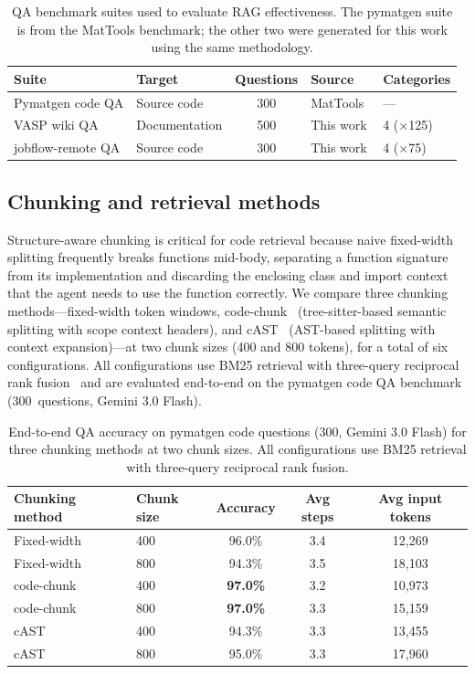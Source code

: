 \documentclass{article}
\begin{document}
\begin{table}[t]
  \caption{QA benchmark suites used to evaluate RAG effectiveness. The pymatgen suite is from the MatTools benchmark; the other two were generated for this work using the same methodology.}
  \label{tbl:benchmarks}
  \centering\small
  \begin{tabular}{llcll}
    \toprule
    Suite & Target & Questions & Source & Categories \\
    \midrule
    Pymatgen code QA & Source code & 300 & MatTools~\citep{Liu2025mattools} & --- \\
    VASP wiki QA & Documentation & 500 & This work & 4 ($\times$125) \\
    jobflow-remote QA & Source code & 300 & This work & 4 ($\times$75) \\
    \bottomrule
  \end{tabular}
\end{table}


\subsection{Chunking and retrieval methods}
\label{sec:chunking}

Structure-aware chunking is critical for code retrieval because naive fixed-width splitting frequently breaks functions mid-body, separating a function signature from its implementation and discarding the enclosing class and import context that the agent needs to use the function correctly.
We compare three chunking methods---fixed-width token windows, code-chunk~\citep{codechunk} (tree-sitter-based semantic splitting with scope context headers), and cAST~\citep{Zhang2025cast} (AST-based splitting with context expansion)---at two chunk sizes (400 and 800 tokens), for a total of six configurations.
All configurations use BM25 retrieval with three-query reciprocal rank fusion~\citep{Cormack2009} and are evaluated end-to-end on the pymatgen code QA benchmark (300~questions, Gemini 3.0 Flash).

\begin{table}[t]
  \caption{End-to-end QA accuracy on pymatgen code questions (300, Gemini 3.0 Flash) for three chunking methods at two chunk sizes. All configurations use BM25 retrieval with three-query reciprocal rank fusion.}
  \label{tbl:chunking}
  \centering\small
  \begin{tabular}{llccc}
    \toprule
    Chunking method & Chunk size & Accuracy & Avg steps & Avg input tokens \\
    \midrule
    Fixed-width & 400 & 96.0\% & 3.4 & 12{,}269 \\
    Fixed-width & 800 & 94.3\% & 3.5 & 18{,}103 \\
    code-chunk & 400 & \textbf{97.0\%} & 3.2 & 10{,}973 \\
    code-chunk & 800 & \textbf{97.0\%} & 3.3 & 15{,}159 \\
    cAST & 400 & 94.3\% & 3.3 & 13{,}455 \\
    cAST & 800 & 95.0\% & 3.3 & 17{,}960 \\
    \bottomrule
  \end{tabular}
\end{table}
\end{document}

